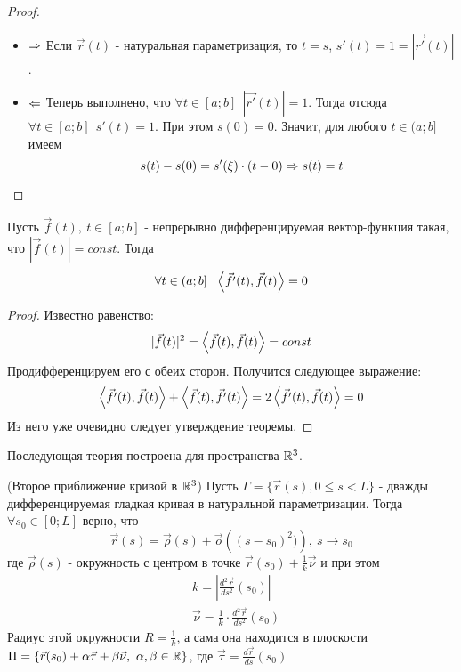 \begin{proof}~
	\begin{itemize}
		\item $\Rightarrow$ Если $\vec{r}(t)$ - натуральная параметризация, то $t = s$, $s'(t) = 1 = |\vec{r'}(t)|$.
		
		\item $\Leftarrow$ Теперь выполнено, что $\forall t \in [a; b]\ \ |\vec{r'}(t)| = 1$. Тогда отсюда $\forall t \in [a; b]\ \ s'(t) = 1$. При этом $s(0) = 0$. Значит, для любого $t \in (a; b]$ имеем
		\[
			s(t) - s(0) = s'(\xi) \cdot (t - 0) \Rightarrow s(t) = t
		\]
	\end{itemize}
\end{proof}

\begin{lemma}
	Пусть $\vec{f}(t),\ t \in [a; b]$ - непрерывно дифференцируемая вектор-функция такая, что $|\vec{f}(t)| = const$. Тогда
	\[
		\forall t \in (a; b] \ \ \trbr{\vec{f'}(t), \vec{f}(t)} = 0
	\]
\end{lemma}

\begin{proof}
	Известно равенство:
	\[
		|\vec{f}(t)|^2 = \left\langle\vec{f}(t), \vec{f}(t)\right\rangle = const
	\]
	Продифференцируем его с обеих сторон. Получится следующее выражение:
	\[
		\left\langle\vec{f'}(t), \vec{f}(t)\right\rangle + \left\langle\vec{f}(t), \vec{f'}(t)\right\rangle = 2\left\langle\vec{f'}(t), \vec{f}(t)\right\rangle = 0
	\]
	Из него уже очевидно следует утверждение теоремы.
\end{proof}

\begin{note}
	Последующая теория построена для пространства $\mathbb{R}^3$.
\end{note}

\begin{theorem} (Второе приближение кривой в $\mathbb{R}^3$)
	Пусть $\Gamma = \{\vec{r}(s), 0 \le s < L\}$ - дважды дифференцируемая гладкая кривая в натуральной параметризации. Тогда $\forall s_0 \in [0; L]$ верно, что
	\[
		\vec{r}(s) = \vec{\rho}(s) + \vec{o}\left((s - s_0)^2)\right),\ s \to s_0
	\]
	где $\vec{\rho}(s)$ - окружность с центром в точке $\vec{r}(s_0) + \frac{1}{k}\vec{\nu}$ и при этом
	\begin{align*}
		&{k = \left|\frac{d^2 \vec{r}}{ds^2}(s_0)\right|}
		\\
		&{\vec{\nu} = \frac{1}{k} \cdot \frac{d^2 \vec{r}}{ds^2}(s_0)}
	\end{align*}
	Радиус этой окружности $R = \frac{1}{k}$, а сама она находится в плоскости $\Pi = \{\vec{r}(s_0) + \alpha \vec{\tau} + \beta \vec{\nu},\ \alpha, \beta \in \mathbb{R}\}$, где $\vec{\tau} = \frac{d\vec{r}}{ds}(s_0)$
\end{theorem}

